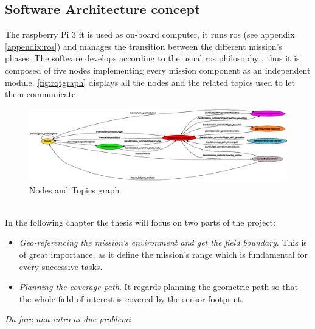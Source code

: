  \subsection{Software Architecture concept} %
 \label{sub:software_design}
 The raspberry Pi 3 it is used as on-board computer, it runs \acrshort{ros} (see appendix \ref{appendix:ros}) and manages the transition between the different mission's phases. The software develops according to the usual \acrshort{ros} philosophy \cite{288}, thus it is composed of five nodes implementing every mission component as an independent module. \autoref{fig:rqtgraph} displays all the nodes and the related topics used to let them communicate.
\begin{figure}[ht]
    \centering
    \includegraphics[width=1.4\textwidth, angle=270]{figures/C1/rqtgraph.eps}
    \caption{Nodes and Topics graph}
    \label{fig:rqtgraph}
\end{figure}\\
 In the following chapter the thesis will focus on two parts of the project:
 \begin{itemize}
  	\item \textit{Geo-referencing the mission's environment and get the field boundary}. This is of great importance, as it define the mission's range which is fundamental for every successive tasks.
  	\item \textit{Planning the coverage path}. It regards planning the geometric path so that the whole field of interest is covered by the sensor footprint.
  \end{itemize}

\textit{Da fare una intro ai due problemi}

 



